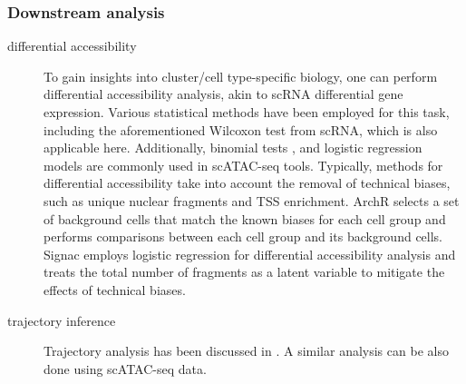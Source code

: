 \subsubsection{Downstream analysis}
\label{background:sec2:atac_downstream}
\begin{description}
	\item[differential accessibility] 
	To gain insights into cluster/cell type-specific biology, one can perform differential accessibility analysis, akin to scRNA differential gene expression. Various statistical methods have been employed for this task, including the aforementioned Wilcoxon test from scRNA, which is also applicable here. Additionally, binomial tests \citep{cusanovich2018single}, and logistic regression models \citep{hao2021seurat4} are commonly used in scATAC-seq tools. Typically, methods for differential accessibility take into account the removal of technical biases, such as unique nuclear fragments and TSS enrichment. ArchR \citep{Granja2021} selects a set of background cells that match the known biases for each cell group and performs comparisons between each cell group and its background cells. Signac \citep{hao2021seurat4} employs logistic regression for differential accessibility analysis and treats the total number of fragments as a latent variable to mitigate the effects of technical biases.
	
	\item[trajectory inference]
	Trajectory analysis has been discussed in . A similar analysis can be also done using scATAC-seq data.


\end{description}
